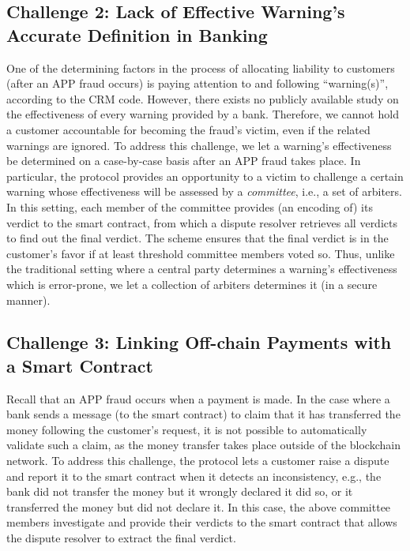 \subsection{Challenge 2: Lack of Effective Warning's Accurate Definition in Banking}\label{sec::Lack-of-Effective-Warning-Definition}

One of the determining  factors in the process of allocating liability to  customers (after an APP fraud occurs) is paying attention to and following ``warning(s)'', according to the CRM code. However, there exists  no  publicly available study  on the  effectiveness of every warning  provided by  a bank. Therefore, we cannot hold a customer accountable for becoming the fraud's victim,  even if the related warnings are ignored.    To address this challenge, we let a warning's effectiveness be determined on a case-by-case basis after an APP fraud takes place. In particular, the protocol provides an opportunity to a victim to  challenge a certain warning whose effectiveness will be assessed by a \emph{committee}, i.e., a  set of arbiters. In this setting, each member of the  committee provides (an encoding of) its verdict to the smart contract, from which a dispute resolver retrieves all verdicts to find out the final verdict. The scheme ensures that the final verdict is  in the customer's favor if at least threshold  committee members voted so. Thus, unlike the traditional setting where a central party determines a warning's effectiveness which is error-prone, we let a collection of arbiters   determines it (in a secure manner).




\subsection{Challenge 3: Linking Off-chain Payments with a Smart Contract}\label{sec::Linking Off-chain-Payments-with-contract}
 Recall that an APP fraud occurs when a payment is made. In the case where a  bank  sends a message (to the smart contract) to  claim  that it has transferred the money following the customer's request, it is not possible to automatically validate such a claim, as the money  transfer takes place  outside of the blockchain network. To address this challenge, the protocol lets a customer raise a dispute and report it to the smart contract when it detects an inconsistency, e.g., the bank did not transfer the money but it wrongly declared it did so, or  it transferred the money but did not declare it. In this case, the above committee members investigate and provide their  verdicts to the smart contract that allows the dispute resolver to extract the final verdict. 



